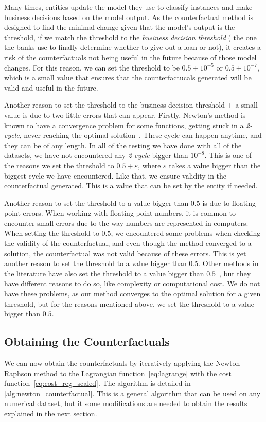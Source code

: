 \documentclass[12pt]{extarticle}
\numberwithin{equation}{section}
\begin{document}
Many times, entities update the model they use to classify instances and make business decisions based on the model output. As the counterfactual method is designed to find the minimal change given that the model's output is the threshold, if we match the threshold to the \emph{business decision threshold} ( the one the banks use to finally determine whether to give out a loan or not), it creates a risk of the counterfactuals not being useful in the future because of those model changes. For this reason, we can set the threshold to be $0.5 + 10^{-5}$ or $0.5 + 10^{-7}$, which is a small value that ensures that the counterfactucals generated will be valid and useful in the future.

Another reason to set the threshold to the business decision threshold + a small value is due to two little errors that can appear. Firstly, Newton's method is known to have a convergence problem for some functions, getting stuck in a \emph{2-cycle}, never reaching the optimal solution~\cite{ypmanewton}. These cycle can happen anytime, and they can be of any length. In all of the testing we have done with all of the datasets, we have not encountered any \emph{2-cycle} bigger than $10^{-8}$. This is one of the reasons we set the threshold to $0.5 + \varepsilon$, where $\varepsilon$ takes a value bigger than the biggest cycle we have encountered. Like that, we ensure validity in the counterfactual generated. This is a value that can be set by the entity if needed.

Another reason to set the threshold to a value bigger than $0.5$ is due to floating-point errors. When working with floating-point numbers, it is common to encounter small errors due to the way numbers are represented in computers. When setting the threshold to $0.5$, we encountered some problems when checking the validity of the counterfactual, and even though the method converged to a solution, the counterfactual was not valid because of these errors. This is yet another reason to set the threshold to a value bigger than $0.5$. Other methods in the literature have also set the threshold to a value bigger than $0.5$~\cite{sgnce}, but they have different reasons to do so, like complexity or computational cost. We do not have these problems, as our method converges to the optimal solution for a given threshold, but for the reasons mentioned above, we set the threshold to a value bigger than $0.5$.

\subsection{Obtaining the Counterfactuals}\label{sec:obtaining_counterfactuals}
We can now obtain the counterfactuals by iteratively applying the Newton-Raphson method to the Lagrangian function~\eqref{eq:lagrange} with the cost function~\eqref{eq:cost_reg_scaled}. The algorithm is detailed in \autoref{alg:newton_counterfactual}. This is a general algorithm that can be used on any numerical dataset, but it some modifications are needed to obtain the results explained in the next section.
\end{document}
